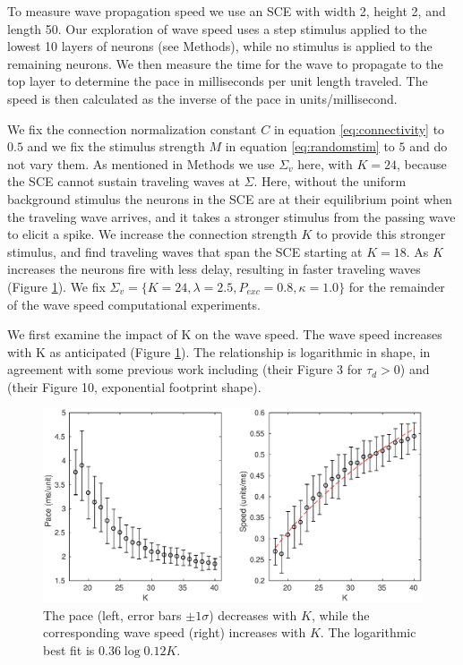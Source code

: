 \FloatBarrier

To measure wave propagation speed we use an SCE with width 2, height 2, and length 50.
Our exploration of wave speed uses a step stimulus applied to the lowest 10 layers of neurons (see Methods), while no stimulus is applied to the remaining neurons.
We then measure the time for the wave to propagate to the top layer to determine the pace in milliseconds per unit length traveled.
The speed is then calculated as the inverse of the pace in units/millisecond.

We fix the connection normalization constant $C$ in equation \ref{eq:connectivity} to $0.5$ and we fix the stimulus strength $M$ in equation \ref{eq:randomstim} to $5$ and do not vary them.
As mentioned in Methods we use $\Sigma_v$ here, with $K=24$, because the SCE cannot sustain traveling waves at $\Sigma$. 
Here, without the uniform background stimulus the neurons in the SCE are at their equilibrium point when the traveling wave arrives, and it takes a stronger stimulus from the passing wave to elicit a spike.
We increase the connection strength $K$ to provide this stronger stimulus, and find traveling waves that span the SCE starting at $K=18$. 
As $K$ increases the neurons fire with less delay, resulting in faster traveling waves (Figure \ref{fig:delay_k}).
We fix $\Sigma_v = \{K=24,\lambda=2.5,P_{exc}=0.8,\kappa=1.0 \}$ for the remainder of the wave speed computational experiments.

We first examine the impact of K on the wave speed.
The wave speed increases with K as anticipated (Figure \ref{fig:delay_k}).
The relationship is logarithmic in shape, in agreement with some previous work including \citet{Golomb1999} (their Figure 3 for $\tau_d>0$) and \citet{Golomb1996}(their Figure 10, exponential footprint shape).
\begin{figure}[!htb]
 \centering
   \includegraphics[width=\textwidth]{fig/WaveSpeed_K}
   \caption{The pace (left, error bars $\pm 1 \sigma$) decreases with $K$, while the corresponding wave speed (right) increases with $K$. 
          The logarithmic best fit is $0.36\log{0.12K}$.}
   \label{fig:delay_k}
\end{figure}

